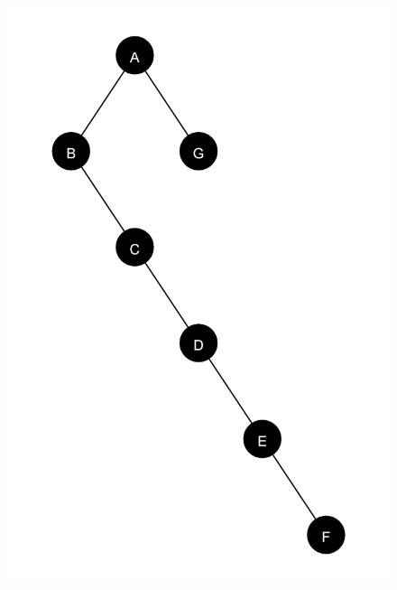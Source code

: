 \begin{figure}[ht]
    \centering
    \begin{minipage}[t]{0.45\linewidth}
        \centering
        \includegraphics[scale = 0.06]{abbildungen/tree_spiegel_1_a3}
    \end{minipage}
    \hfill
    \begin{minipage}[t]{0.45\linewidth}
        \centering

\end{minipage}
\end{figure}

